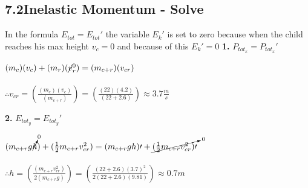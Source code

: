 \subsection*{7.2\hspace*{0.5cm}Inelastic Momentum - Solve}
In the formula $E_{tot} = E_{tot}\prime$ the variable $E_{k}\prime$ is set to zero because when the child reaches his max height $v_{c} = 0$ and because of this $E_{k}\prime = 0$\newline\newline
\textbf{1.} $P_{tot_{x}} = P_{tot_{x}}\prime$ \\
\begin{adjustwidth}{0.6cm}{0pt}
    $(m_{c})({v}_{c}) + (m_{r})(\cancel{v}_{r}^0) = (m_{c + r})(v_{cr})$ \\\\
    $\therefore v_{cr} = \left(\frac{(m_{c})(v_{c})}{(m_{c + r})}\right) = \left(\frac{(22)(4.2)}{(22 + 2.6)}\right) \approx 3.7\frac{m}{s}$
\end{adjustwidth}\vspace*{15pt}
\textbf{2.} $E_{tot_{y}} = E_{tot_{y}}\prime$ \\
\begin{adjustwidth}{0.6cm}{0pt}
    $(m_{c+r}g\cancelto{0}{h}) + (\frac{1}{2}m_{c+r}v_{cr}^2) = (m_{c + r}gh)\prime + \cancelto{0}{(\frac{1}{2}m_{c+r}v_{cr}^2)\prime}$ \\\\
    $\therefore h = \left(\frac{(m_{c+r}v_{cr}^2)}{2(m_{c+r}g)}\right) = \left(\frac{(22 + 2.6){(3.7)}^2}{2(22 + 2.6)(9.81)}\right) \approx 0.7m$
\end{adjustwidth}\vspace*{15pt}